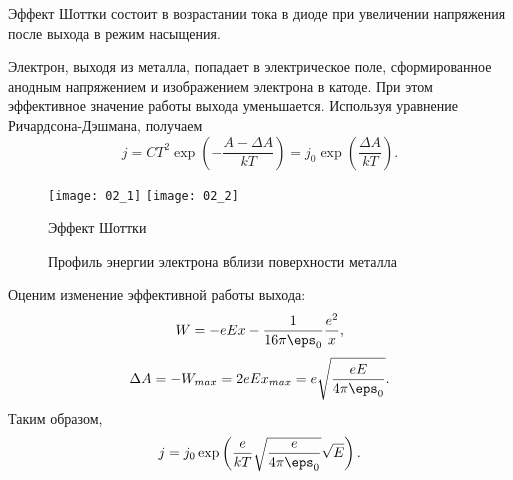 Эффект Шоттки состоит в возрастании тока в диоде при увеличении напряжения после
выхода в режим насыщения.

Электрон, выходя из металла, попадает в электрическое поле, сформированное
анодным напряжением и изображением электрона в катоде. При этом эффективное
значение работы выхода уменьшается. Используя уравнение Ричардсона-Дэшмана,
получаем
\[
    j = CT^2\exp\left(-\frac{A-\Delta A}{kT}\right) =
    j_0\exp\left(\frac{\Delta A}{kT}\right).
\]
\begin{figure}[h]
\begin{center}
    \texttt{[image: 02\_1]} \hfill
    \texttt{[image: 02\_2]}
    \parbox[t]{.47\textwidth}
    {\caption{Эффект Шоттки}}\hfill
    \parbox[t]{.47\textwidth}
    {\caption{Профиль энергии электрона вблизи поверхности металла}}
\end{center}
\end{figure}

Оценим изменение эффективной работы выхода:
\[
    W = -eEx - \frac{1}{16\pi\eps_0}\frac{e^2}{x},
\]
\[
    \Delta A = -W_{max} = 2eEx_{max} = e\sqrt{\frac{eE}{4\pi\eps_0}}.
\]
Таким образом,
\[
    j = j_0\exp\left(\frac{e}{kT}\sqrt{\frac{e}{4\pi\eps_0}}\sqrt{E}\right).
\]
